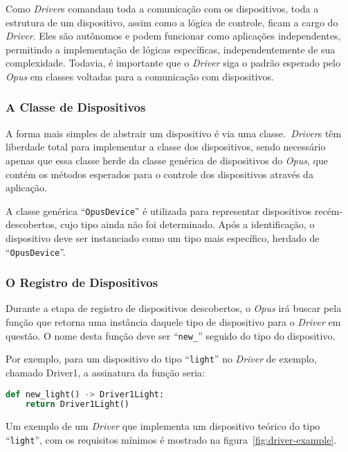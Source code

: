 Como \emph{Driver}s comandam toda a comunicação com os dispositivos, toda a estrutura de um dispositivo, assim como a lógica de controle, 
ficam a cargo do \emph{Driver}. Eles são autônomos e podem funcionar como aplicações independentes, permitindo a implementação de lógicas específicas,
independentemente de sua complexidade. Todavia, é importante que o \emph{Driver} siga o padrão esperado pelo \emph{Opus} em classes
voltadas para a comunicação com dispositivos.

\subsubsection{A Classe de Dispositivos}
A forma mais simples de abstrair um dispositivo é via uma classe.\ \emph{Driver}s têm liberdade total para implementar a classe dos dispositivos,
sendo necessário apenas que essa classe herde da classe genérica de dispositivos do \emph{Opus}, que contém os métodos esperados para 
o controle dos dispositivos através da aplicação. 

A classe genérica ``\lstinline{OpusDevice}'' é utilizada para representar dispositivos recém-descobertos, cujo tipo ainda não foi determinado. 
Após a identificação, o dispositivo deve ser instanciado como um tipo mais específico, herdado de ``\lstinline{OpusDevice}''. 

\subsubsection{O Registro de Dispositivos}
Durante a etapa de registro de dispositivos descobertos, o \emph{Opus} irá buscar pela função que retorna uma instância daquele tipo de dispositivo para o
\emph{Driver} em questão. O nome desta função deve ser ``\lstinline{new_}'' seguido do tipo do dispositivo. 

Por exemplo, para um dispositivo do tipo ``\lstinline{light}'' no \emph{Driver} de exemplo, chamado Driver1, a assinatura da função seria:

\begin{lstlisting}[language=Python]
def new_light() -> Driver1Light:
    return Driver1Light()
\end{lstlisting}

Um exemplo de um \emph{Driver} que implementa um dispositivo teórico do tipo ``\lstinline{light}'', com os requisitos mínimos é mostrado 
na figura~\ref{fig:driver-example}.